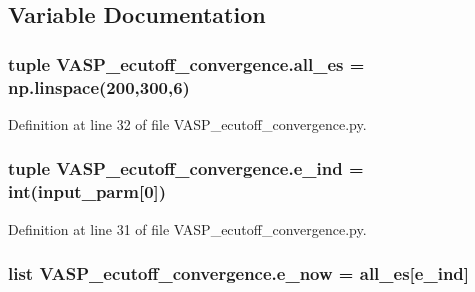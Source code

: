 \subsection{Variable Documentation}
\hypertarget{namespace_v_a_s_p__ecutoff__convergence_aeeae920ec4c0b378e7329b859edcbadc}{
\subsubsection[{all\+\_\+es}]{\setlength{\rightskip}{0pt plus 5cm}tuple V\+A\+S\+P\+\_\+ecutoff\+\_\+convergence.\+all\+\_\+es = np.\+linspace(200,300,6)}}\label{namespace_v_a_s_p__ecutoff__convergence_aeeae920ec4c0b378e7329b859edcbadc}


Definition at line 32 of file V\+A\+S\+P\+\_\+ecutoff\+\_\+convergence.\+py.

\hypertarget{namespace_v_a_s_p__ecutoff__convergence_a6c83348a585fff1e90f3cd6281c53322}{
\subsubsection[{e\+\_\+ind}]{\setlength{\rightskip}{0pt plus 5cm}tuple V\+A\+S\+P\+\_\+ecutoff\+\_\+convergence.\+e\+\_\+ind = int({\bf input\+\_\+parm}\mbox{[}0\mbox{]})}}\label{namespace_v_a_s_p__ecutoff__convergence_a6c83348a585fff1e90f3cd6281c53322}


Definition at line 31 of file V\+A\+S\+P\+\_\+ecutoff\+\_\+convergence.\+py.

\hypertarget{namespace_v_a_s_p__ecutoff__convergence_adae3249c19422f60c853d15e432a0e40}{
\subsubsection[{e\+\_\+now}]{\setlength{\rightskip}{0pt plus 5cm}list V\+A\+S\+P\+\_\+ecutoff\+\_\+convergence.\+e\+\_\+now = {\bf all\+\_\+es}\mbox{[}{\bf e\+\_\+ind}\mbox{]}}}\label{namespace_v_a_s_p__ecutoff__convergence_adae3249c19422f60c853d15e432a0e40}


